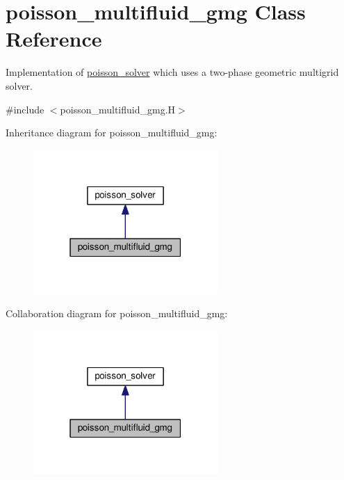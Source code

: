 \hypertarget{classpoisson__multifluid__gmg}{}\section{poisson\+\_\+multifluid\+\_\+gmg Class Reference}
\label{classpoisson__multifluid__gmg}


Implementation of \hyperlink{classpoisson__solver}{poisson\+\_\+solver} which uses a two-\/phase geometric multigrid solver.  




{\ttfamily \#include $<$poisson\+\_\+multifluid\+\_\+gmg.\+H$>$}



Inheritance diagram for poisson\+\_\+multifluid\+\_\+gmg\+:\nopagebreak
\begin{figure}[H]
\begin{center}
\leavevmode
\includegraphics[width=199pt]{classpoisson__multifluid__gmg__inherit__graph}
\end{center}
\end{figure}


Collaboration diagram for poisson\+\_\+multifluid\+\_\+gmg\+:\nopagebreak
\begin{figure}[H]
\begin{center}
\leavevmode
\includegraphics[width=199pt]{classpoisson__multifluid__gmg__coll__graph}
\end{center}
\end{figure}
